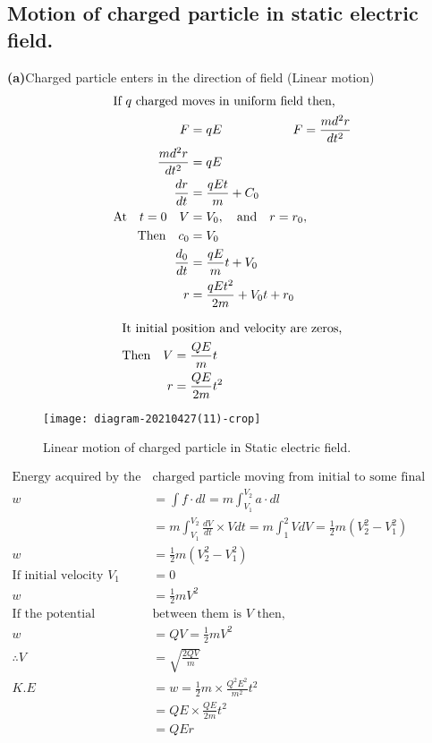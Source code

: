 \subsection{Motion of charged particle in static electric field.}
\textbf{(a)}\quad Charged particle enters in the direction of field (Linear motion)
\begin{align*}
\intertext{If $q$ charged moves in uniform field then,}
F&=q E \hspace{2cm} F=\frac{md^2r}{dt^2}\\
\frac{md^2r}{dt^2}&=qE\\
\frac{dr}{dt}&=\frac{qEt}{m}+C_0\\
\text{At} \quad t=0\quad V&=V_0,\quad \text{and}\quad r=r_0,\\
\text{Then}\quad c_0&=V_0\\
\frac{d_0}{dt}&=\frac{qE}{m}t+V_0\\
r&=\frac{qEt^2}{2m}+V_0t+r_0
\end{align*} 
 \begin{minipage}{0.65\textwidth}
 	\begin{align*}
 	\intertext{It initial position and velocity are zeros,}
 	\text{Then}\quad V&=\frac{Q E}{m}t\\
 	r&=\frac{Q E}{2m}t^2
 \end{align*} 	
 	\end{minipage}
 \begin{minipage}{0.35\textwidth}
 	\begin{figure}[H]
 		\texttt{[image: diagram-20210427(11)-crop]}
 		\caption{Linear motion of charged particle in Static electric field.}
 		\label{Linear motion of charged particle}
 	\end{figure}
 \end{minipage}
\begin{align*}
\text{Energy acquired by the  }&\text{charged particle moving from initial to some final point,}\\
w&=\int f\cdot dl=m\int_{V_1}^{V_2}a\cdot dl\\
&=m\int_{V_1}^{V_2}\frac{dV}{dt}\times Vdt=m\int_{1}^{2}VdV=\frac{1}{2}m(V^2_2-V^2_1)\\
w&=\frac{1}{2}m(V^2_2-V^2_1)\\
\text{If initial velocity }V_1&=0\\
w&=\frac{1}{2}mV^2\\
\text{If the potential difference }&\text{between them is $V$ then,}\\
w&=QV=\frac{1}{2}mV^2\\
\therefore V&=\sqrt{\frac{2QV}{m}}\\
K.E&=w=\frac{1}{2}m\times\frac{Q^2 E^2}{m^2}t^2\\
&=QE\times\frac{QE}{2m}t^2\\
&=QEr
\end{align*}
